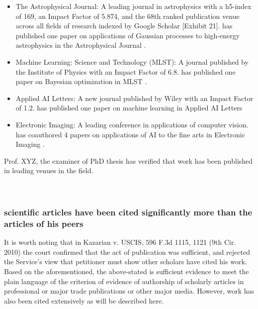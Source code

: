 \documentclass[11pt]{article}
\begin{document}
\begin{itemize}
    \item The Astrophysical Journal: A leading journal in astrophysics with a h5-index of 169, an Impact Factor of 5.874, and the 68th ranked publication venue across all fields of research indexed by Google Scholar [Exhibit 21]. \dr has published one paper on applications of Gaussian processes to high-energy astrophysics in the Astrophysical Journal \cite{cv, mrk}.
    \item Machine Learning: Science and Technology (MLST): A journal published by the Institute of Physics with an Impact Factor of 6.8. \dr has published one paper on Bayesian optimization in MLST \cite{cv, achieving}.
    \item Applied AI Letters: A new journal published by Wiley with an Impact Factor of 1.2. \dr has published one paper on machine learning in Applied AI Letters \cite{cv, bourached}
    \item Electronic Imaging: A leading conference in applications of computer vision. \dr has coauthored 4 papers on applications of AI to the fine arts in Electronic Imaging \cite{cv, raiders, greg, saints, res}.
\end{itemize}

Prof. XYZ, the examiner of \drs PhD thesis has verified that \drs work has been published in leading venues in the field.\\

\\\\ \pl

\subsubsection{\drs scientific articles have been cited significantly more than the articles of his peers}
\label{articlespeers}

It is worth noting that in Kazarian v. USCIS, 596 F.3d 1115, 1121 (9th Cir. 2010) the court confirmed that the act of publication was sufficient, and rejected the Service’s view that petitioner must show other scholars have cited his work. Based on the aforementioned, the above-stated is sufficient evidence to meet the plain language of the criterion of evidence of authorship of scholarly articles in professional or major trade
publications or other major media. However, \drs work has also been cited extensively as will be described here. \\
\end{document}

